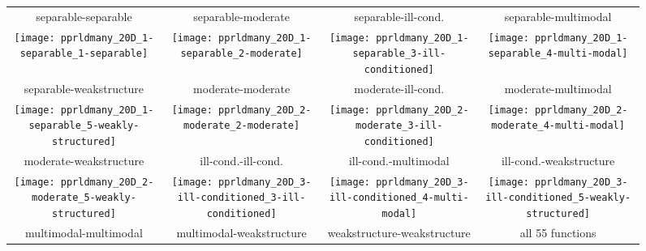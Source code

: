 \documentclass{sig-alternate}
\begin{document}



\begin{figure*}
\begin{tabular}{c@{\hspace*{-0.02\textwidth}}c@{\hspace*{-0.02\textwidth}}c@{\hspace*{-0.02\textwidth}}c}
separable-separable & separable-moderate & separable-ill-cond. & separable-multimodal\\
\texttt{[image: pprldmany\_20D\_1-separable\_1-separable]} &
\texttt{[image: pprldmany\_20D\_1-separable\_2-moderate]} &
\texttt{[image: pprldmany\_20D\_1-separable\_3-ill-conditioned]} &
\texttt{[image: pprldmany\_20D\_1-separable\_4-multi-modal]}\\
separable-weakstructure & moderate-moderate & moderate-ill-cond. & moderate-multimodal\\
\texttt{[image: pprldmany\_20D\_1-separable\_5-weakly-structured]} &
\texttt{[image: pprldmany\_20D\_2-moderate\_2-moderate]} &
\texttt{[image: pprldmany\_20D\_2-moderate\_3-ill-conditioned]} &
\texttt{[image: pprldmany\_20D\_2-moderate\_4-multi-modal]}\\
moderate-weakstructure & ill-cond.-ill-cond. & ill-cond.-multimodal & ill-cond.-weakstructure\\
\texttt{[image: pprldmany\_20D\_2-moderate\_5-weakly-structured]} &
\texttt{[image: pprldmany\_20D\_3-ill-conditioned\_3-ill-conditioned]} &
\texttt{[image: pprldmany\_20D\_3-ill-conditioned\_4-multi-modal]} &
\texttt{[image: pprldmany\_20D\_3-ill-conditioned\_5-weakly-structured]} \\
multimodal-multimodal & multimodal-weakstructure & weakstructure-weakstructure & all 55 functions\\

\end{tabular}
\end{figure*}
\end{document}
